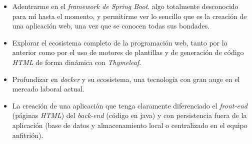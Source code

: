 \begin{itemize}
	\item Adentrarme en el \textit{framework de Spring Boot}. algo totalmente desconocido para mí hasta el momento, y permitirme ver lo sencillo que es la creación de una aplicación web, una vez que se conocen todas sus bondades.
	\item Explorar el ecosistema completo de la programación web, tanto por lo anterior como por el uso de motores de plantillas y de generación de código \textit{HTML} de forma dinámica con \textit{Thymeleaf}.
	\item Profundizar en \textit{docker} y su ecosistema, una tecnología con gran auge en el mercado laboral actual.
	\item La creación de una aplicación que tenga claramente diferenciado el \textit{front-end} (páginas \textit{HTML}) del \textit{back-end} (código en java) y con persistencia fuera de la aplicación (base de datos y almacenamiento local o centralizado en el equipo anfitrión).
\end{itemize}